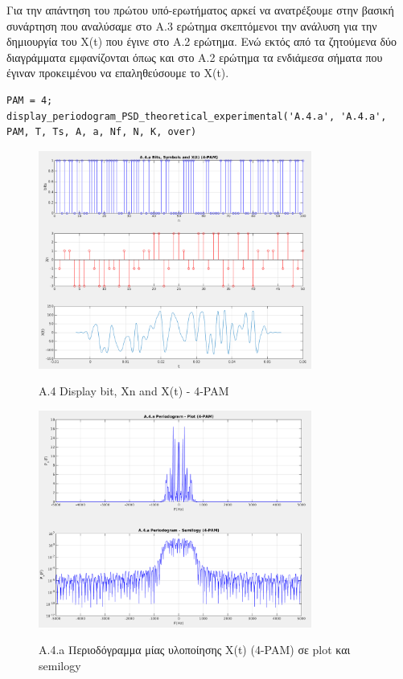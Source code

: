 \documentclass[11pt]{article}
\begin{document}
    \par \noindent
    Για την απάντηση του πρώτου υπό-ερωτήματος αρκεί να ανατρέξουμε στην βασική συνάρτηση που αναλύσαμε στο Α.3 ερώτημα σκεπτόμενοι την ανάλυση για την δημιουργία του X(t) που έγινε στο Α.2 ερώτημα.
    Ενώ εκτός από τα ζητούμενα δύο διαγράμματα εμφανίζονται όπως και στο A.2 ερώτημα τα ενδιάμεσα σήματα που έγιναν προκειμένου να επαληθεύσουμε το X(t).
    
    \begin{lstlisting}[caption = {A.4.a Periodogram - Theoretical and Experimental PSD}]
PAM = 4;
display_periodogram_PSD_theoretical_experimental('A.4.a', 'A.4.a', PAM, T, Ts, A, a, Nf, N, K, over)
    \end{lstlisting}
    
    \begin{figure}[H]
        \centering
        \includegraphics[scale=0.5, width=0.8\textwidth]{figures/A4.0-b_Xn_Xt.png} \\
        \caption{A.4 Display bit, Xn and X(t) - 4-PAM}
    \end{figure}
    
    \begin{figure}[H]
        \centering
        \includegraphics[scale=0.5, width=0.8\textwidth]{figures/A4.1-Periodogram.png} \\
        \caption{A.4.a Περιοδόγραμμα μίας υλοποίησης X(t) (4-PAM) σε plot και semilogy}
    \end{figure}
    
\end{document}
